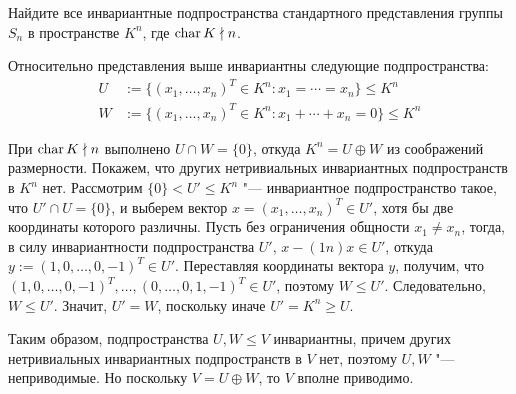 \begin{problem}
	Найдите все инвариантные подпространства стандартного представления группы $S_n$ в пространстве $K^n$, где $\operatorname{char}{K} \nmid n$.
\end{problem}

\begin{solution}
	Относительно представления выше инвариантны следующие подпространства:
	\begin{align*}
		U &:= \{(x_1, \dotsc, x_n)^T \in K^n : x_1 = \dotsb = x_n\} \le K^n
		\\
		W &:= \{(x_1, \dotsc, x_n)^T \in K^n : x_1 + \dotsb + x_n = 0\} \le K^n
	\end{align*}
	
	При $\operatorname{char}{K} \nmid n$ выполнено $U \cap W = \{0\}$, откуда $K^n = U \oplus W$ из соображений размерности. Покажем, что других нетривиальных инвариантных подпространств в $K^n$ нет. Рассмотрим $\{0\} < U' \le K^n$ "--- инвариантное подпространство такое, что $U' \cap U = \{0\}$, и выберем вектор $x = (x_1, \dotsc, x_n)^T \in U'$, хотя бы две координаты которого различны. Пусть без ограничения общности $x_1 \ne x_n$, тогда, в силу инвариантности подпространства $U'$, $x - (1n)x \in U'$, откуда $y := (1, 0, \dotsc, 0, -1)^T \in U'$. Переставляя координаты вектора $y$, получим, что $(1, 0, \dotsc, 0, -1)^T, \dotsc, (0, \dotsc, 0, 1, -1)^T \in U'$, поэтому $W \le U'$. Следовательно, $W \le U'$. Значит, $U' = W$, поскольку иначе $U' = K^n \ge U$.
	
	Таким образом, подпространства $U, W \le V$ инвариантны, причем других нетривиальных инвариантных подпространств в $V$ нет, поэтому $U, W$ "--- неприводимые. Но поскольку $V = U \oplus W$, то $V$ вполне приводимо.
\end{solution}